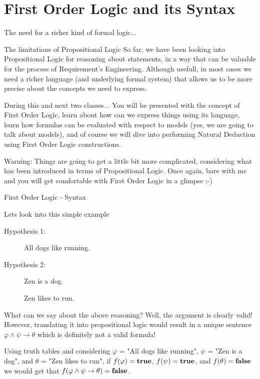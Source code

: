 \documentclass[aspectratio=169]{beamer}
\begin{document}
\frame[plain]{\titlepage}


\section{First Order Logic and its Syntax}

\begin{slide}{The need for a richer kind of formal logic...}
\small

\begin{block}{The limitations of Propositional Logic}
 So far, we have been looking into Propositional Logic for reasoning about statements, in a way that can be valuable for the process of Requirement's Engineering. Although usefull, in most cases we need a richer language (and underlying formal system) that allows us to be more precise about the concepts we need to express.
\end{block}

\begin{block}{During this and next two classes...}
You will be presented with the concept of First Order Logic, learn about how can we express things using its language, learn how formulas can be evaluated with respect to models (yes, we are going to talk about models), and of course we will dive into performing Natural Deduction using First Order Logic constructions.
\end{block}


\begin{alert}{Warning:}
Things are going to get a little bit more complicated, considering what has been introduced in terms of Propositional Logic. Once again, bare with me and you will get comfortable with First Order Logic in a glimpse ;-)
\end{alert}

\end{slide}


\begin{slide}{First Order Logic - Syntax}

\begin{block}{Lets look into this simple example}
\begin{description}
  \item [Hypothesis 1:] All dogs like running.
  \item [Hypothesis 2:] Zen is a dog.
  \item [\color{red}{Conclusion:}] Zen likes to run.
\end{description}
\end{block}

\begin{block}{What can we say about the above reasoning?}
Well, the argument is clearly valid! However, translating it into propositional logic would result in a unique sentence $\varphi \land \psi \to \theta$ which is definitely not a valid formula!

Using truth tables and considering $\varphi$ = "All dogs like running", $\psi$ = "Zen is a dog", and $\theta$ = "Zen likes to run", if $f(\varphi) = {\bf true}$, $f(\psi) = {\bf true}$, and $f(\theta) = {\bf false}$ we would get that $f(\varphi \land \psi \to \theta) = {\bf false}$.
\end{block}
\end{slide}
\end{document}
